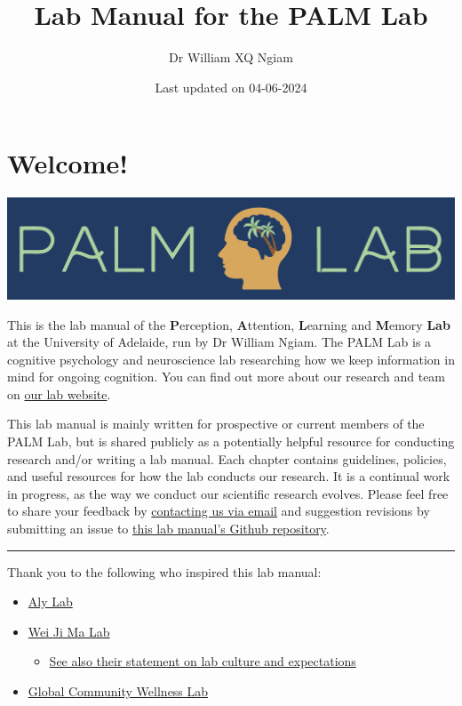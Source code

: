 \documentclass[
]{book}
\title{Lab Manual for the PALM Lab}
\author{Dr William XQ Ngiam}
\date{Last updated on 04-06-2024}
\providecommand{\tightlist}{%
  \setlength{\itemsep}{0pt}\setlength{\parskip}{0pt}}
\begin{document}
\maketitle

{
\setcounter{tocdepth}{1}
\tableofcontents
}
\hypertarget{welcome}{%
\chapter*{Welcome!}\label{welcome}}

\includegraphics{images/banner.png}

This is the lab manual of the \textbf{P}erception, \textbf{A}ttention, \textbf{L}earning and \textbf{M}emory \textbf{Lab} at the University of Adelaide, run by Dr William Ngiam. The PALM Lab is a cognitive psychology and neuroscience lab researching how we keep information in mind for ongoing cognition. You can find out more about our research and team on \href{https://palm-lab.github.io}{our lab website}.

This lab manual is mainly written for prospective or current members of the PALM Lab, but is shared publicly as a potentially helpful resource for conducting research and/or writing a lab manual. Each chapter contains guidelines, policies, and useful resources for how the lab conducts our research. It is a continual work in progress, as the way we conduct our scientific research evolves. Please feel free to share your feedback by \href{mailto:palm.laboratory@gmail.com}{contacting us via email} and suggestion revisions by submitting an issue to \href{https://github.com/PALM-lab/lab-manual/issues}{this lab manual's Github repository}.

\begin{center}\rule{0.5\linewidth}{0.5pt}\end{center}

Thank you to the following who inspired this lab manual:

\begin{itemize}
\tightlist
\item
  \href{https://github.com/alylab/labmanual/blob/master/aly-lab-manual.pdf}{Aly Lab}
\item
  \href{https://www.cns.nyu.edu/malab/lablife.html}{Wei Ji Ma Lab}

  \begin{itemize}
  \tightlist
  \item
    \href{https://docs.google.com/document/d/1f6foaCkHiCkPKjO0gdKkkdm2dn1EKn5xRKZv-Ut5Dg4/edit?usp=sharing}{See also their statement on lab culture and expectations}
  \end{itemize}
\item
  \href{https://bookdown.org/jordandanielsnyder/LabManual/expectations-and-responsiblities.html}{Global Community Wellness Lab}
\end{itemize}
\end{document}
